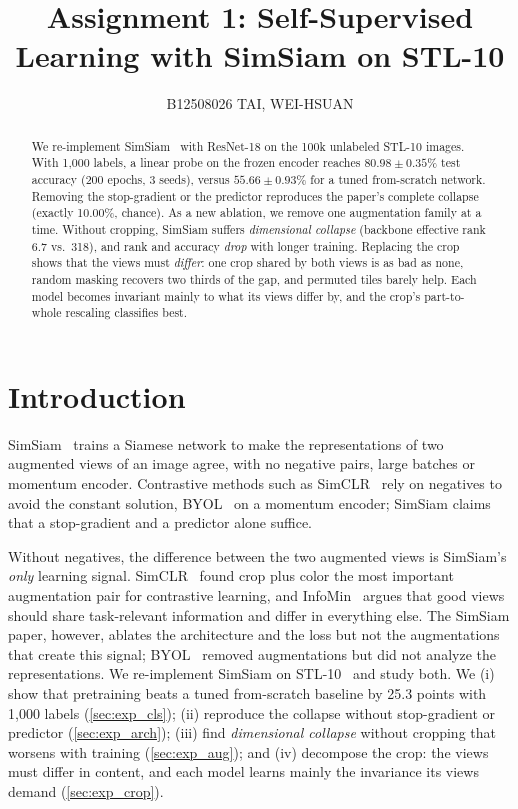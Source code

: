 \documentclass[10pt,twocolumn,letterpaper]{article}
\title{Assignment 1: Self-Supervised Learning with SimSiam on STL-10}
\author{B12508026 TAI, WEI-HSUAN}
\begin{document}
\maketitle

\begin{abstract}
We re-implement SimSiam~\cite{chen2021simsiam} with ResNet-18 on the 100k unlabeled STL-10 images.
With 1,000 labels, a linear probe on the frozen encoder reaches $80.98\pm0.35\%$ test accuracy (200 epochs, 3 seeds), versus $55.66\pm0.93\%$ for a tuned from-scratch network.
Removing the stop-gradient or the predictor reproduces the paper's complete collapse (exactly 10.00\%, chance).
As a new ablation, we remove one augmentation family at a time. Without cropping, SimSiam suffers \emph{dimensional collapse} (backbone effective rank 6.7 vs.\ 318), and rank and accuracy \emph{drop} with longer training.
Replacing the crop shows that the views must \emph{differ}: one crop shared by both views is as bad as none, random masking recovers two thirds of the gap, and permuted tiles barely help. Each model becomes invariant mainly to what its views differ by, and the crop's part-to-whole rescaling classifies best.
\end{abstract}

\section{Introduction}
\label{sec:intro}

SimSiam~\cite{chen2021simsiam} trains a Siamese network to make the representations of two augmented views of an image agree, with no negative pairs, large batches or momentum encoder.
Contrastive methods such as SimCLR~\cite{chen2020simclr} rely on negatives to avoid the constant solution, BYOL~\cite{grill2020byol} on a momentum encoder; SimSiam claims that a stop-gradient and a predictor alone suffice.

Without negatives, the difference between the two augmented views is SimSiam's \emph{only} learning signal.
SimCLR~\cite{chen2020simclr} found crop plus color the most important augmentation pair for contrastive learning, and InfoMin~\cite{tian2020infomin} argues that good views should share task-relevant information and differ in everything else.
The SimSiam paper, however, ablates the architecture and the loss but not the augmentations that create this signal; BYOL~\cite{grill2020byol} removed augmentations but did not analyze the representations.
We re-implement SimSiam on STL-10~\cite{coates2011stl10} and study both.
We (i) show that pretraining beats a tuned from-scratch baseline by 25.3 points with 1,000 labels (\cref{sec:exp_cls}); (ii) reproduce the collapse without stop-gradient or predictor (\cref{sec:exp_arch}); (iii) find \emph{dimensional collapse} without cropping that worsens with training (\cref{sec:exp_aug}); and (iv) decompose the crop: the views must differ in content, and each model learns mainly the invariance its views demand (\cref{sec:exp_crop}).
\end{document}
